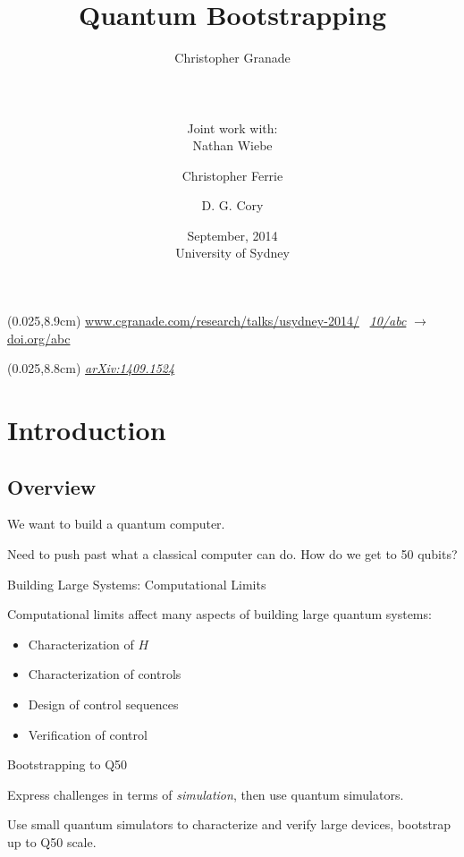 \documentclass[xcolor=dvipsnames, compress]{beamer}
\title{Quantum Bootstrapping}
\author[Granade, Wiebe, Ferrie and Cory]{
  Christopher Granade  \\
  \rule{0.35\textwidth}{0.125pt}\\
  {\footnotesize Joint work with:}\\
  Nathan Wiebe \and
  Christopher Ferrie \and
  D. G. Cory
}
\institute[IQC]{
  Institute for Quantum Computing\\
  {University of Waterloo, Ontario, Canada}
}
\date[September 2014]{
  September, 2014 \\
  {\footnotesize University of Sydney}
}
\renewcommand\UrlFont{\color{red}\rmfamily\itshape}
\newcommand{\shortdoi}[1]{\href{http://doi.org/#1}{\UrlFont 10/#1}}
\newcommand{\bottomnote}[1]{
  \begin{textblock*}{0.95\paperwidth} (0.025\paperwidth,8.9cm)
    {\tiny \hfill #1}
  \end{textblock*}
}
\begin{document}
\begin{frame}[plain]
  \titlepage
  \bottomnote{\url{www.cgranade.com/research/talks/usydney-2014/} \textbullet~\shortdoi{abc} $\to$ \url{doi.org/abc}}

  \begin{textblock*}{0.95\paperwidth} (0.025\paperwidth,8.8cm)
    {\href{https://scirate.com/arxiv/1409.1524}{\UrlFont{arXiv:1409.1524}}}
  \end{textblock*}
\end{frame}

\section{Introduction}
\subsection{Overview}

\begin{frame}
  
  \begin{block}{}
    We want to build a quantum computer.
  \end{block}

  \pause

  Need to push past what a classical computer can do.
  How do we get to 50 qubits?

\end{frame}

\begin{frame}{Building Large Systems: Computational Limits}

  Computational limits affect many aspects of building
  large quantum systems:

  \begin{itemize}[<+->]
    \item Characterization of $H$
    \item Characterization of controls
    \item Design of control sequences
    \item Verification of control
  \end{itemize}


\end{frame}

\begin{frame}{Bootstrapping to Q50}

  Express challenges in terms of \emph{simulation}, then
  use \alert<2>{quantum simulators}.

  \begin{block}{}
    Use small quantum simulators to characterize and verify
    large devices, bootstrap up to Q50 scale.
  \end{block}

\end{frame}
\end{document}
